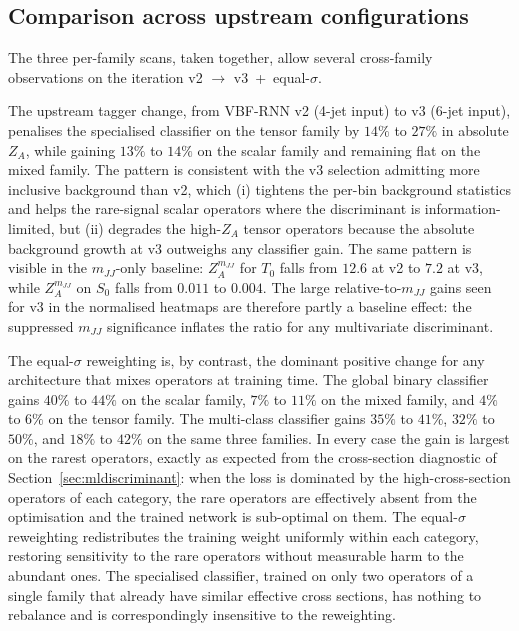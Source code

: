 \subsection{Comparison across upstream configurations}
\label{sec:sens_iteration}

The three per-family scans, taken together, allow several cross-family observations on the iteration v2 $\to$ v3~+~equal-$\sigma$.

The upstream tagger change, from VBF-RNN v2 (4-jet input) to v3 (6-jet input), penalises the specialised classifier on the tensor family by $14\%$ to $27\%$ in absolute $Z_A$, while gaining $13\%$ to $14\%$ on the scalar family and remaining flat on the mixed family. The pattern is consistent with the v3 selection admitting more inclusive background than v2, which (i) tightens the per-bin background statistics and helps the rare-signal scalar operators where the discriminant is information-limited, but (ii) degrades the high-$Z_A$ tensor operators because the absolute background growth at v3 outweighs any classifier gain. The same pattern is visible in the $m_{JJ}$-only baseline: $Z_A^{m_{JJ}}$ for $T_0$ falls from $12.6$ at v2 to $7.2$ at v3, while $Z_A^{m_{JJ}}$ on $S_0$ falls from $0.011$ to $0.004$. The large relative-to-$m_{JJ}$ gains seen for v3 in the normalised heatmaps are therefore partly a baseline effect: the suppressed $m_{JJ}$ significance inflates the ratio for any multivariate discriminant.

The equal-$\sigma$ reweighting is, by contrast, the dominant positive change for any architecture that mixes operators at training time. The global binary classifier gains $40\%$ to $44\%$ on the scalar family, $7\%$ to $11\%$ on the mixed family, and $4\%$ to $6\%$ on the tensor family. The multi-class classifier gains $35\%$ to $41\%$, $32\%$ to $50\%$, and $18\%$ to $42\%$ on the same three families. In every case the gain is largest on the rarest operators, exactly as expected from the cross-section diagnostic of Section~\ref{sec:mldiscriminant}: when the loss is dominated by the high-cross-section operators of each category, the rare operators are effectively absent from the optimisation and the trained network is sub-optimal on them. The equal-$\sigma$ reweighting redistributes the training weight uniformly within each category, restoring sensitivity to the rare operators without measurable harm to the abundant ones. The specialised classifier, trained on only two operators of a single family that already have similar effective cross sections, has nothing to rebalance and is correspondingly insensitive to the reweighting.

